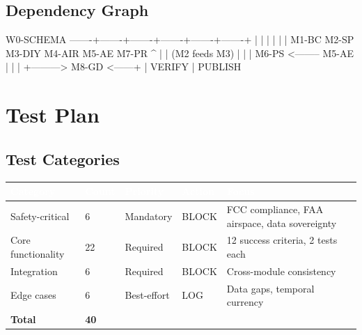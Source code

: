 \documentclass[11pt,letterpaper]{article}
\newcommand{\tableheader}[1]{\textbf{\sffamily\textcolor{white}{#1}}}
\begin{document}
\subsection{Dependency Graph}

\begin{asciibox}
W0-SCHEMA -------+-------+-------+-------+-------+-------+
                 |       |       |       |       |       |
              M1-BC   M2-SP   M3-DIY  M4-AIR  M5-AE   M7-PR
                                  ^                        |
                                  |  (M2 feeds M3)         |
                                  |                        |
                              M6-PS <-------- M5-AE        |
                                  |                        |
                                  +---------> M8-GD <------+
                                                 |
                                             VERIFY
                                                 |
                                            PUBLISH
\end{asciibox}

\section{Test Plan}

\subsection{Test Categories}

\begin{center}
\begin{tabularx}{\textwidth}{L{3cm}C{1.5cm}C{2cm}C{2cm}X}
\toprule
{}
\tableheader{Category} & \tableheader{Count} & \tableheader{Priority} & \tableheader{Action} & \tableheader{Focus} \\
\midrule
Safety-critical & 6 & Mandatory & BLOCK & FCC compliance, FAA airspace, data sovereignty \\
Core functionality & 22 & Required & BLOCK & 12 success criteria, 2 tests each \\
Integration & 6 & Required & BLOCK & Cross-module consistency \\
Edge cases & 6 & Best-effort & LOG & Data gaps, temporal currency \\
\midrule
\textbf{Total} & \textbf{40} & & & \\
\bottomrule
\end{tabularx}
\end{center}
\end{document}
